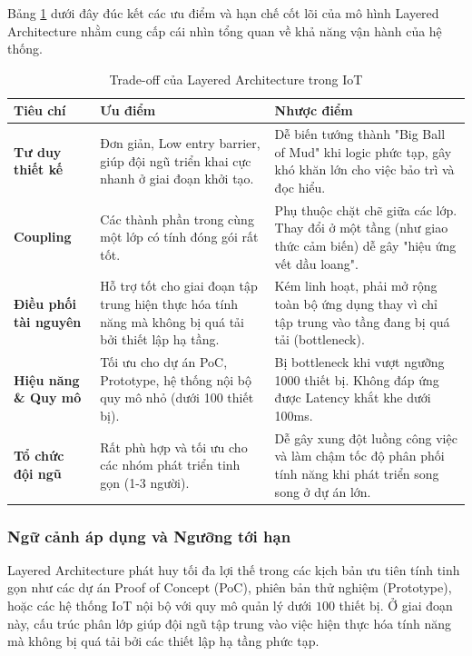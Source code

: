 Bảng \ref{tab:layered-tradeoffs} dưới đây đúc kết các ưu điểm và hạn chế cốt lõi của mô hình Layered Architecture nhằm cung cấp cái nhìn tổng quan về khả năng vận hành của hệ thống.

\begin{table}[H]
\centering
\caption{Trade-off của Layered Architecture trong IoT}
\label{tab:layered-tradeoffs}
\begin{tabular}{|p{3.5cm}|p{5.5cm}|p{5.5cm}|}
\hline
\textbf{Tiêu chí} & \textbf{Ưu điểm} & \textbf{Nhược điểm} \\ \hline
\textbf{Tư duy thiết kế} & Đơn giản, Low entry barrier, giúp đội ngũ triển khai cực nhanh ở giai đoạn khởi tạo. & Dễ biến tướng thành "Big Ball of Mud" khi logic phức tạp, gây khó khăn lớn cho việc bảo trì và đọc hiểu. \\ \hline
\textbf{Coupling} & Các thành phần trong cùng một lớp có tính đóng gói rất tốt. & Phụ thuộc chặt chẽ giữa các lớp. Thay đổi ở một tầng (như giao thức cảm biến) dễ gây "hiệu ứng vết dầu loang". \\ \hline
\textbf{Điều phối tài nguyên} & Hỗ trợ tốt cho giai đoạn tập trung hiện thực hóa tính năng mà không bị quá tải bởi thiết lập hạ tầng. & Kém linh hoạt, phải mở rộng toàn bộ ứng dụng thay vì chỉ tập trung vào tầng đang bị quá tải (bottleneck). \\ \hline
\textbf{Hiệu năng \& Quy mô} & Tối ưu cho dự án PoC, Prototype, hệ thống nội bộ quy mô nhỏ (dưới 100 thiết bị). & Bị bottleneck khi vượt ngưỡng 1000 thiết bị. Không đáp ứng được Latency khắt khe dưới 100ms. \\ \hline
\textbf{Tổ chức đội ngũ} & Rất phù hợp và tối ưu cho các nhóm phát triển tinh gọn (1-3 người). & Dễ gây xung đột luồng công việc và làm chậm tốc độ phân phối tính năng khi phát triển song song ở dự án lớn. \\ \hline
\end{tabular}
\end{table}

\subsubsection{Ngữ cảnh áp dụng và Ngưỡng tới hạn}
Layered Architecture phát huy tối đa lợi thế trong các kịch bản ưu tiên tính tinh gọn như các dự án Proof of Concept (PoC), phiên bản thử nghiệm (Prototype), hoặc các hệ thống IoT nội bộ với quy mô quản lý dưới $100$ thiết bị. Ở giai đoạn này, cấu trúc phân lớp giúp đội ngũ tập trung vào việc hiện thực hóa tính năng mà không bị quá tải bởi các thiết lập hạ tầng phức tạp.

